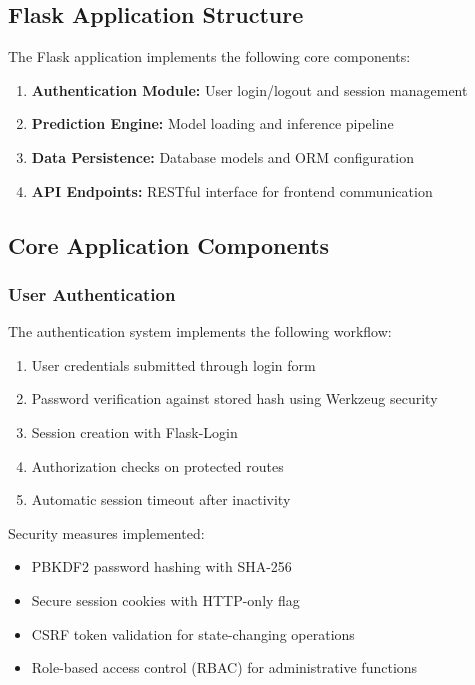 \documentclass[12pt,a4paper,twoside]{report}
\begin{document}
\subsection{Flask Application Structure}

The Flask application implements the following core components:

\begin{enumerate}
    \item \textbf{Authentication Module:} User login/logout and session management
    \item \textbf{Prediction Engine:} Model loading and inference pipeline
    \item \textbf{Data Persistence:} Database models and ORM configuration
    \item \textbf{API Endpoints:} RESTful interface for frontend communication
\end{enumerate}

\subsection{Core Application Components}

\subsubsection{User Authentication}

The authentication system implements the following workflow:

\begin{enumerate}
    \item User credentials submitted through login form
    \item Password verification against stored hash using Werkzeug security
    \item Session creation with Flask-Login
    \item Authorization checks on protected routes
    \item Automatic session timeout after inactivity
\end{enumerate}

Security measures implemented:

\begin{itemize}
    \item PBKDF2 password hashing with SHA-256
    \item Secure session cookies with HTTP-only flag
    \item CSRF token validation for state-changing operations
    \item Role-based access control (RBAC) for administrative functions
\end{itemize}
\end{document}
